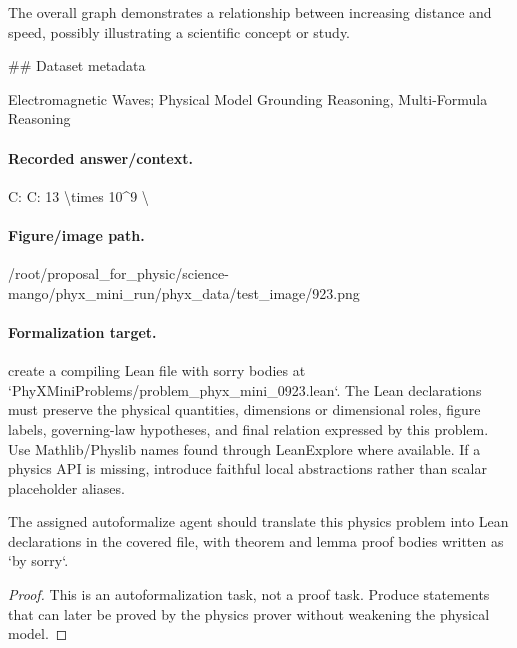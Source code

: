 The overall graph demonstrates a relationship between increasing distance and speed, possibly illustrating a scientific concept or study.

\#\# Dataset metadata

Electromagnetic Waves; Physical Model Grounding Reasoning, Multi-Formula Reasoning

\paragraph{Recorded answer/context.}
C: C: 13 \textbackslash{}times 10\textasciicircum{}9 \textbackslash{}

\paragraph{Figure/image path.}
/root/proposal\_for\_physic/science-mango/phyx\_mini\_run/phyx\_data/test\_image/923.png

\paragraph{Formalization target.}
create a compiling Lean file with sorry bodies at `PhyXMiniProblems/problem\_phyx\_mini\_0923.lean`. The Lean declarations must preserve the physical quantities, dimensions or dimensional roles, figure labels, governing-law hypotheses, and final relation expressed by this problem.
Use Mathlib/Physlib names found through LeanExplore where available. If a physics API is missing, introduce faithful local abstractions rather than scalar placeholder aliases.

\begin{theorem}
\label{thm:physics:phyx_mini_0923:target}
The assigned autoformalize agent should translate this physics problem into Lean declarations in the covered file, with theorem and lemma proof bodies written as `by sorry`.
\end{theorem}
\begin{proof}
This is an autoformalization task, not a proof task. Produce statements that can later be proved by the physics prover without weakening the physical model.
\end{proof}

